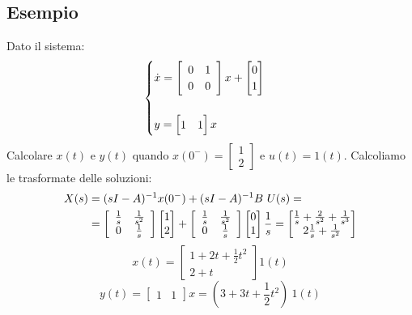 \documentclass[../main.tex]{subfiles}
\begin{document}
	\subsection*{Esempio}
	Dato il sistema:
	\[\begin{cases}
		\dot x = \matTwo{0}{1}{0}{0} x + \left[ \begin{matrix} 0\\1 \end{matrix} \right]\\
		\smallskip\\
		y = \left[ \begin{matrix} 1 &1 \end{matrix} \right] x
	\end{cases} \]
	Calcolare $ x(t) $ e $ y(t) $ quando $ x(0^-) = \left[ \begin{matrix} 1\\ 2 \end{matrix} \right] $ e $ u(t) = 1(t) $.
	Calcoliamo le trasformate delle soluzioni:
	\begin{align*}
		X(s) &= (sI-A)^{-1} x(0^-) + (sI-A)^{-1} B\ U(s) =\\
		&= \left[ \begin{array}{cc} \frac{1}{s} & \frac{1}{s^2}\\ 0 & \frac{1}{s} \end{array} \right] \left[ \begin{matrix} 1\\ 2 \end{matrix} \right] + \left[ \begin{array}{cc} \frac{1}{s} & \frac{1}{s^2}\\ 0 & \frac{1}{s} \end{array} \right] \left[ \begin{matrix} 0\\1 \end{matrix} \right] \frac{1}{s} = \left[ \begin{matrix} \frac{1}{s}+\frac{2}{s^2}+\frac{1}{s^3}\\ 2\frac{1}{s}+\frac{1}{s^2} \end{matrix} \right] 
	\end{align*}
	\[ x(t) = \left[ \begin{matrix} 1+2t+\frac{1}{2}t^2\\ 2+t \end{matrix} \right] 1(t) \]
	\[ y(t) = \left[ \begin{matrix} 1 &1 \end{matrix} \right] x = (3+3t+\frac{1}{2}t^2)\ 1(t) \]
\end{document}
